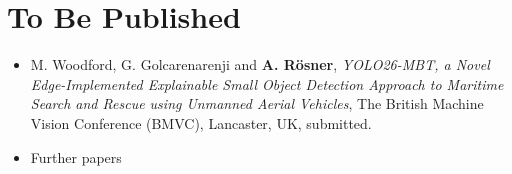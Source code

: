 \chapter*{To Be Published}

\begin{itemize}
   \item M. Woodford, G. Golcarenarenji and {\textbf{A. Rösner}}, \textit{YOLO26-MBT, a Novel Edge-Implemented Explainable Small Object Detection Approach to Maritime Search and Rescue using Unmanned Aerial Vehicles}, The British Machine Vision Conference (BMVC), Lancaster, UK, submitted.
   \item Further papers
\end{itemize}
